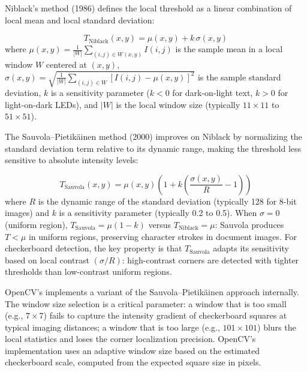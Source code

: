 Niblack's method (1986) defines the local threshold as a linear combination of local mean and local standard deviation:

\begin{eqblock}
\begin{equation}
T_{\text{Niblack}}(x,y) = \mu(x,y) + k\,\sigma(x,y)
\end{equation}
where $\mu(x,y) = \frac{1}{|W|}\sum_{(i,j)\in W(x,y)} I(i,j)$ is the sample mean in a local window $W$ centered at $(x,y)$, $\sigma(x,y) = \sqrt{\frac{1}{|W|}\sum_{(i,j)\in W} [I(i,j)-\mu(x,y)]^2}$ is the sample standard deviation, $k$ is a sensitivity parameter ($k<0$ for dark-on-light text, $k>0$ for light-on-dark LEDs), and $|W|$ is the local window size (typically $11\times11$ to $51\times51$).
\end{eqblock}

The Sauvola--Pietikäinen method (2000) improves on Niblack by normalizing the standard deviation term relative to its dynamic range, making the threshold less sensitive to absolute intensity levels:

\begin{eqblock}
\begin{equation}
T_{\text{Sauvola}}(x,y) = \mu(x,y)\left(1 + k\left(\frac{\sigma(x,y)}{R}-1\right)\right)
\end{equation}
where $R$ is the dynamic range of the standard deviation (typically 128 for 8-bit images) and $k$ is a sensitivity parameter (typically 0.2 to 0.5). When $\sigma=0$ (uniform region), $T_{\text{Sauvola}} = \mu(1-k)$ versus $T_{\text{Niblack}} = \mu$: Sauvola produces $T<\mu$ in uniform regions, preserving character strokes in document images. For checkerboard detection, the key property is that $T_{\text{Sauvola}}$ adapts its sensitivity based on local contrast $(\sigma/R)$: high-contrast corners are detected with tighter thresholds than low-contrast uniform regions.
\end{eqblock}

OpenCV's  implements a variant of the Sauvola--Pietikäinen approach internally. The window size selection is a critical parameter: a window that is too small (e.g., $7\times7$) fails to capture the intensity gradient of checkerboard squares at typical imaging distances; a window that is too large (e.g., $101\times101$) blurs the local statistics and loses the corner localization precision. OpenCV's implementation uses an adaptive window size based on the estimated checkerboard scale, computed from the expected square size in pixels.

